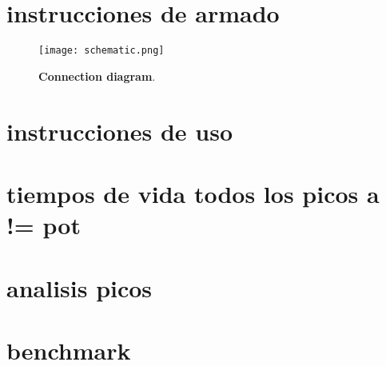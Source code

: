 
\renewcommand{\thesection}{\Alph{section}}

\section{instrucciones de armado} \label{apendice:instrucciones_armado}

\begin{figure}[h]
     \centering
     \texttt{[image: schematic.png]}
     \caption{\textbf{Connection diagram}.
     }
     \label{fig:schematic}
\end{figure}

\section{instrucciones de uso} \label{apendice:instrucciones_uso}
\section{tiempos de vida todos los picos a != pot}
\section{analisis picos}
\section{benchmark}